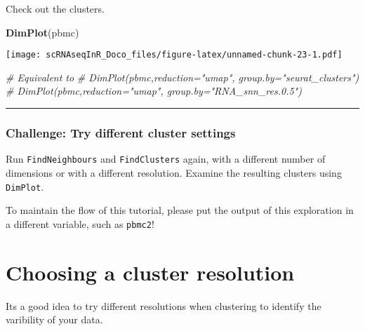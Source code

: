 \documentclass[
]{book}
\newenvironment{Shaded}{\begin{snugshade}}{\end{snugshade}}
\newcommand{\CommentTok}[1]{\textcolor[rgb]{0.56,0.35,0.01}{\textit{#1}}}
\newcommand{\FunctionTok}[1]{\textcolor[rgb]{0.13,0.29,0.53}{\textbf{#1}}}
\newcommand{\NormalTok}[1]{#1}
\begin{document}
Check out the clusters.

\begin{Shaded}
\begin{Highlighting}[]
\FunctionTok{DimPlot}\NormalTok{(pbmc)}
\end{Highlighting}
\end{Shaded}

\texttt{[image: scRNAseqInR\_Doco\_files/figure-latex/unnamed-chunk-23-1.pdf]}

\begin{Shaded}
\begin{Highlighting}[]
\CommentTok{\# Equivalent to}
\CommentTok{\# DimPlot(pbmc,reduction="umap", group.by="seurat\_clusters")}
\CommentTok{\# DimPlot(pbmc,reduction="umap", group.by="RNA\_snn\_res.0.5")}
\end{Highlighting}
\end{Shaded}

\begin{center}\rule{0.5\linewidth}{0.5pt}\end{center}

\hypertarget{challenge-try-different-cluster-settings}{%
\subsubsection*{Challenge: Try different cluster settings}\label{challenge-try-different-cluster-settings}}

Run \texttt{FindNeighbours} and \texttt{FindClusters} again, with a different number of dimensions or with a different resolution. Examine the resulting clusters using \texttt{DimPlot}.

To maintain the flow of this tutorial, please put the output of this exploration in a different variable, such as \texttt{pbmc2}!

\hypertarget{choosing-a-cluster-resolution}{%
\section{Choosing a cluster resolution}\label{choosing-a-cluster-resolution}}

Its a good idea to try different resolutions when clustering to identify the varibility of your data.
\end{document}
